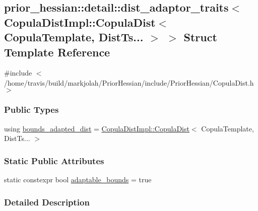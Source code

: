 \hypertarget{structprior__hessian_1_1detail_1_1dist__adaptor__traits_3_01CopulaDistImpl_1_1CopulaDist_3_01Cop7279db6753e87d864b5bda4f78bd9862}{}\subsection{prior\+\_\+hessian\+:\+:detail\+:\+:dist\+\_\+adaptor\+\_\+traits$<$ Copula\+Dist\+Impl\+:\+:Copula\+Dist$<$ Copula\+Template, Dist\+Ts... $>$ $>$ Struct Template Reference}
\label{structprior__hessian_1_1detail_1_1dist__adaptor__traits_3_01CopulaDistImpl_1_1CopulaDist_3_01Cop7279db6753e87d864b5bda4f78bd9862}


{\ttfamily \#include $<$/home/travis/build/markjolah/\+Prior\+Hessian/include/\+Prior\+Hessian/\+Copula\+Dist.\+h$>$}

\subsubsection*{Public Types}
\begin{DoxyCompactItemize}
\item 
using \hyperlink{structprior__hessian_1_1detail_1_1dist__adaptor__traits_3_01CopulaDistImpl_1_1CopulaDist_3_01Cop7279db6753e87d864b5bda4f78bd9862_ae3a35bd30510bdacae57d72ed37817f9}{bounds\+\_\+adapted\+\_\+dist} = \hyperlink{classprior__hessian_1_1CopulaDistImpl_1_1CopulaDist}{Copula\+Dist\+Impl\+::\+Copula\+Dist}$<$ Copula\+Template, Dist\+Ts... $>$
\end{DoxyCompactItemize}
\subsubsection*{Static Public Attributes}
\begin{DoxyCompactItemize}
\item 
static constexpr bool \hyperlink{structprior__hessian_1_1detail_1_1dist__adaptor__traits_3_01CopulaDistImpl_1_1CopulaDist_3_01Cop7279db6753e87d864b5bda4f78bd9862_a428052cc472c130bde338d279d28a7b2}{adaptable\+\_\+bounds} = true
\end{DoxyCompactItemize}


\subsubsection{Detailed Description}
